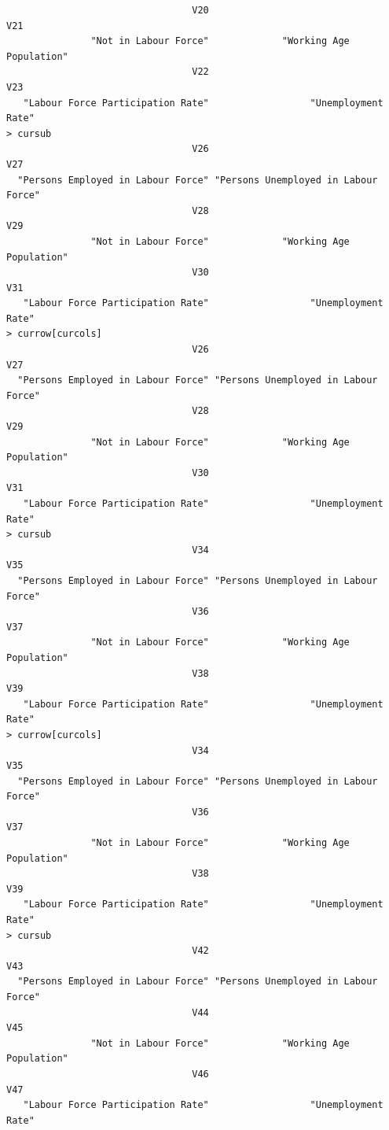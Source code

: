 \documentclass[a4paper]{article}
\begin{document}
\begin{verbatim}
                                 V20                                  V21 
               "Not in Labour Force"             "Working Age Population" 
                                 V22                                  V23 
   "Labour Force Participation Rate"                  "Unemployment Rate" 
> cursub 
                                 V26                                  V27 
  "Persons Employed in Labour Force" "Persons Unemployed in Labour Force" 
                                 V28                                  V29 
               "Not in Labour Force"             "Working Age Population" 
                                 V30                                  V31 
   "Labour Force Participation Rate"                  "Unemployment Rate" 
> currow[curcols] 
                                 V26                                  V27 
  "Persons Employed in Labour Force" "Persons Unemployed in Labour Force" 
                                 V28                                  V29 
               "Not in Labour Force"             "Working Age Population" 
                                 V30                                  V31 
   "Labour Force Participation Rate"                  "Unemployment Rate" 
> cursub 
                                 V34                                  V35 
  "Persons Employed in Labour Force" "Persons Unemployed in Labour Force" 
                                 V36                                  V37 
               "Not in Labour Force"             "Working Age Population" 
                                 V38                                  V39 
   "Labour Force Participation Rate"                  "Unemployment Rate" 
> currow[curcols] 
                                 V34                                  V35 
  "Persons Employed in Labour Force" "Persons Unemployed in Labour Force" 
                                 V36                                  V37 
               "Not in Labour Force"             "Working Age Population" 
                                 V38                                  V39 
   "Labour Force Participation Rate"                  "Unemployment Rate" 
> cursub 
                                 V42                                  V43 
  "Persons Employed in Labour Force" "Persons Unemployed in Labour Force" 
                                 V44                                  V45 
               "Not in Labour Force"             "Working Age Population" 
                                 V46                                  V47 
   "Labour Force Participation Rate"                  "Unemployment Rate" 

\end{verbatim}
\end{document}
